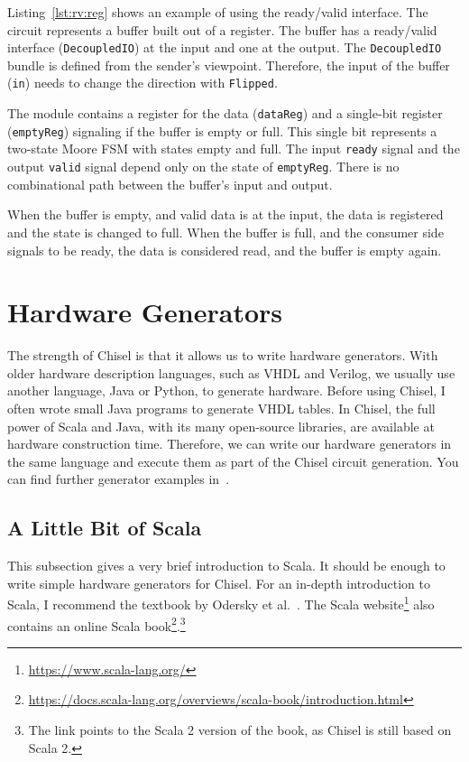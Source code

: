 \documentclass[%
    10pt,
    headinclude, footinclude=false,
    openright, %
    notitlepage,
    cleardoublepage=empty,
    headsepline,
    numbers=noenddot,
    bibliography=totoc, index=totoc,
    ]{scrbook}
\newcommand{\code}[1]{{\lstinline[basicstyle=\small\ttfamily]{#1}}}
\newcommand{\myref}[2]{\href{#1}{#2}}
\renewcommand{\myref}[2]{{#2}{\footnote{\url{#1}}}}
\begin{document}
Listing~\ref{lst:rv:reg} shows an example of using the ready/valid interface.
The circuit represents a buffer built out of a register.
The buffer has a ready/valid interface (\code{DecoupledIO}) at the input and one at the output.
The \code{DecoupledIO} bundle is defined from the sender's viewpoint. Therefore,
the input of the buffer (\code{in}) needs to change the direction with \code{Flipped}.

The module contains a register for the data (\code{dataReg}) and a single-bit
register (\code{emptyReg}) signaling if the buffer is empty or full.
This single bit represents a two-state Moore FSM with states empty and full.
The input \code{ready} signal and the output \code{valid} signal depend only
on the state of \code{emptyReg}. There is no combinational path between the
buffer's input and output.

When the buffer is empty, and valid data is at the input, the data is registered
and the state is changed to full. When the buffer is full, and the consumer side signals
to be ready, the data is considered read, and the buffer is empty again.


\chapter{Hardware Generators}
\label{ch:gen}

The strength of Chisel is that it allows us to write hardware generators.
With older hardware description languages, such as VHDL and Verilog,
we usually use another language, Java or Python, to generate hardware.
Before using Chisel, I often wrote small Java programs to generate VHDL tables.
In Chisel, the full power of Scala and Java, with its many open-source libraries,
are available at hardware construction time. Therefore, we can write our hardware
generators in the same language and execute them as part of the Chisel circuit generation.
You can find further generator examples in~\cite{hwgen:chisel:2024}.

\section{A Little Bit of Scala}

This subsection gives a very brief introduction to Scala. It should be enough
to write simple hardware generators for Chisel.
For an in-depth introduction to Scala, I recommend the textbook by Odersky et al.~\cite{Scala}.
The \myref{https://www.scala-lang.org/}{Scala website} also contains an
\myref{https://docs.scala-lang.org/overviews/scala-book/introduction.html}{online Scala book}.\footnote{The link
points to the Scala 2 version of the book, as Chisel is still based on Scala 2.}
\end{document}
